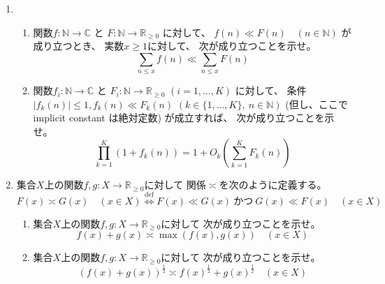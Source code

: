 \documentclass[12pt,b5paper]{ltjsarticle}
\begin{document}
\hrulefill

\begin{enumerate}
 \item
      \begin{enumerate}
       \item
            関数$f:\mathbb{N}\to\mathbb{C}$
            と
            $F:\mathbb{N}\to\mathbb{R}_{\geq 0}$
            に対して、
            $f(n) \ll F(n) \quad (n\in\mathbb{N})$
            が成り立つとき、
            実数$x\geq 1$に対して、
            次が成り立つことを示せ。
            \begin{equation}
             \sum_{n\leq x} f(n) \ll \sum_{n\leq x} F(n)
            \end{equation}

       \item
            関数$f_{i}:\mathbb{N}\to\mathbb{C}$
            と
            $F_{i}:\mathbb{N}\to\mathbb{R}_{\geq 0}$
            $(i=1,\dots,K)$
            に対して、
            条件
            $\lvert f_{k}(n) \rvert \leq 1, f_{k}(n) \ll F_{k}(n)$
            $(k\in\{1,\dots,K\}, \ n\in\mathbb{N})$
            (但し、ここで implicit constant は絶対定数)
            が成立すれば、
            次が成り立つことを示せ。
            \begin{equation}
             \prod_{k=1}^{K} (1 + f_{k}(n))
              = 1 + O_{k}\left( \sum_{k=1}^{K}F_{k}(n) \right)
            \end{equation}

      \end{enumerate}

 \item
      集合$X$上の関数$f,g:X\to\mathbb{R}_{\geq 0}$に対して
      関係$\asymp$を次のように定義する。
      \begin{equation}
       F(x) \asymp G(x) \quad (x\in X)
        \overset{\mathrm{def}}{\iff}
        F(x) \ll G(x) \ \text{かつ} \ G(x) \ll F(x) \quad (x\in X)
      \end{equation}
      \begin{enumerate}
       \item
            集合$X$上の関数$f,g:X\to\mathbb{R}_{\geq 0}$に対して
            次が成り立つことを示せ。
            \begin{equation}
             f(x)+g(x) \asymp \max(f(x),g(x)) \quad (x\in X)
            \end{equation}

       \item
            集合$X$上の関数$f,g:X\to\mathbb{R}_{\geq 0}$に対して
            次が成り立つことを示せ。
            \begin{equation}
             (f(x)+g(x))^{\frac{1}{2}}
              \asymp
              f(x)^{\frac{1}{2}}+g(x)^{\frac{1}{2}} \quad (x\in X)
            \end{equation}


\end{enumerate}
\end{enumerate}
\end{document}
